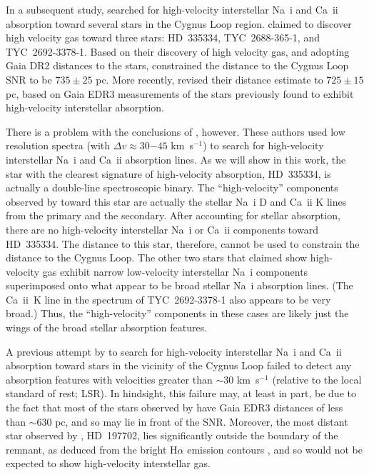 \documentclass[fleqn,usenatbib]{mnras}
\begin{document}
In a subsequent study, \citet{f18b} searched for high-velocity interstellar Na~{\sc i} and Ca~{\sc ii} absorption toward several stars in the Cygnus Loop region. \citet{f18b} claimed to discover high velocity gas toward three stars: HD~335334, TYC~2688-365-1, and TYC~2692-3378-1. Based on their discovery of high velocity gas, and adopting Gaia DR2 distances to the stars, \citet{f18b} constrained the distance to the Cygnus Loop SNR to be $735\pm25$ pc. More recently, \citet{f21} revised their distance estimate to $725\pm15$ pc, based on Gaia EDR3 measurements of the stars previously found to exhibit high-velocity interstellar absorption.

There is a problem with the conclusions of \citet{f18b}, however. These authors used low resolution spectra (with $\Delta v\approx30$$-$$45$ km~s$^{-1}$) to search for high-velocity interstellar Na~{\sc i} and Ca~{\sc ii} absorption lines. As we will show in this work, the star with the clearest signature of high-velocity absorption, HD~335334, is actually a double-line spectroscopic binary. The ``high-velocity'' components observed by \citet{f18b} toward this star are actually the stellar Na~{\sc i} D and Ca~{\sc ii} K lines from the primary and the secondary. After accounting for stellar absorption, there are no high-velocity interstellar Na~{\sc i} or Ca~{\sc ii} components toward HD~335334. The distance to this star, therefore, cannot be used to constrain the distance to the Cygnus Loop. The other two stars that \citet{f18b} claimed show high-velocity gas exhibit narrow low-velocity interstellar Na~{\sc i} components superimposed onto what appear to be broad stellar Na~{\sc i} absorption lines. (The Ca~{\sc ii}~K line in the spectrum of TYC~2692-3378-1 also appears to be very broad.) Thus, the ``high-velocity'' components in these cases are likely just the wings of the broad stellar absorption features.

A previous attempt by \citet{w02} to search for high-velocity interstellar Na~{\sc i} and Ca~{\sc ii} absorption toward stars in the vicinity of the Cygnus Loop failed to detect any absorption features with velocities greater than $\sim$30 km~s$^{-1}$ (relative to the local standard of rest; LSR). In hindsight, this failure may, at least in part, be due to the fact that most of the stars observed by \citet{w02} have Gaia EDR3 distances of less than $\sim$630 pc, and so may lie in front of the SNR. Moreover, the most distant star observed by \citet{w02}, HD~197702, lies significantly outside the boundary of the remnant, as deduced from the bright H$\alpha$ emission contours \citep[see, e.g., Figure~1 in][]{w02}, and so would not be expected to show high-velocity interstellar gas.
\end{document}
